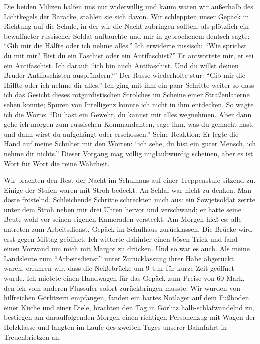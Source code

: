\documentclass[a5paper,pagesize,10pt,twoside=true]{scrbook}
\renewcommand{\marginpar}[2][]{}
\begin{document}
Die beiden Milizen halfen uns nur widerwillig und kaum waren wir außerhalb des Lichtkegels der Baracke, stahlen sie sich davon. Wir schleppten unser Gepäck in Richtung auf die Schule, in der wir die Nacht zubringen sollten, als plötzlich ein bewaffneter russischer Soldat auftauchte und mir in gebrochenem deutsch sagte: \enquote{Gib mir die Hälfte oder ich nehme alles.} Ich erwiderte russisch: \enquote{Wie sprichst du mit mir? Bist du ein Faschist oder ein Antifaschist?} Er antwortete mir, er sei ein Antifaschist. Ich darauf: \enquote{ich bin auch Antifaschist. Und du willst deinen Bruder Antifaschisten ausplündern?} Der Russe wiederholte stur: \enquote{Gib mir die Hälfte oder ich nehme dir alles.} Ich ging mit ihm ein paar Schritte weiter so dass ich das Gesicht dieses rotgardistischen Strolches im Scheine einer Straßenlaterne sehen konnte; Spuren von Intelligenz konnte ich nicht in ihm entdecken. So wagte ich die Worte: \enquote{Du hast ein Gewehr, du kannst mir alles wegnehmen. Aber dann gehe ich morgen zum russischen Kommandanten, sage ihm, was du gemacht hast, und dann wirst du aufgehängt oder erschossen.} Seine Reaktion: Er legte die Hand auf meine Schulter mit den Worten: \enquote{ich sehe, du bist ein guter Mensch, ich nehme dir nichts.} Dieser Vorgang mag völlig unglaubwürdig scheinen, aber es ist Wort für Wort die reine Wahrheit.

\marginpar{122} Wir brachten den Rest der Nacht im Schulhaus auf einer Treppenstufe sitzend zu. Einige der Stufen waren mit Stroh bedeckt. An Schlaf war nicht zu denken. Man döste fröstelnd. Schleichende Schritte schreckten mich aus: ein Sowjetsoldat zerrte unter dem Stroh neben mir drei Uhren hervor und verschwand; er hatte seine Beute wohl vor seinen eigenen Kameraden versteckt. Am Morgen hieß es: alle antreten zum Arbeitsdienst, Gepäck im Schulhaus zurücklassen. Die Brücke wird erst gegen Mittag geöffnet. Ich witterte dahinter einen bösen Trick und fand einen Vorwand um mich mit Margot zu drücken. Und so war es auch. Als meine Landsleute zum \enquote{Arbeitsdienst} unter Zurücklassung ihrer Habe abgerückt waren, erfuhren wir, dass die Neißebrücke um 9 Uhr für kurze Zeit geöffnet wurde. Ich mietete einen Handwagen für das Gepäck zum Preise von 60 Mark, den ich vom anderen Flussufer sofort zurückbringen musste. Wir wurden von hilfreichen Görlitzern empfangen, fanden ein hartes Notlager auf dem Fußboden einer Küche und einer Diele, brachten den Tag in Görlitz halb-schlafwandelnd zu, bestiegen am darauffolgenden Morgen einen richtigen Personenzug mit Wagen der Holzklasse und langten im Laufe des zweiten Tages unserer Bahnfahrt in Treuenbrietzen an.
\end{document}
